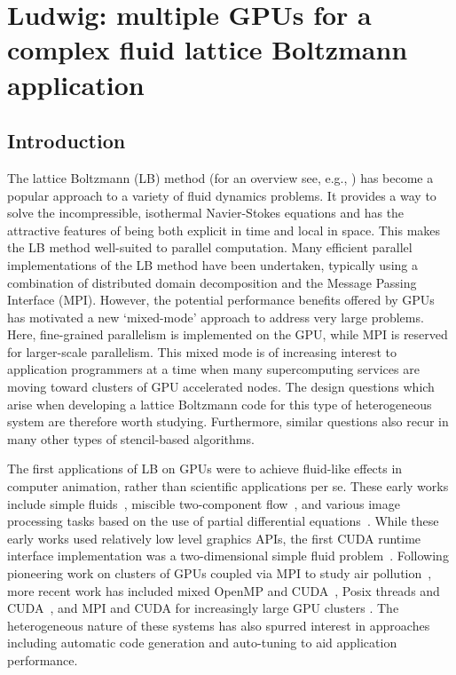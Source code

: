 
\chapter{Ludwig: multiple GPUs for a complex fluid lattice Boltzmann
application}



\section{Introduction}  
The lattice Boltzmann (LB) method (for an overview see, e.g.,
\cite{succi-book}) has become a popular approach to a variety of fluid
dynamics problems.  It provides a way to solve the incompressible,
isothermal Navier-Stokes equations and has the attractive features of
being both explicit in time and local in space. This makes the LB
method well-suited to parallel computation. Many efficient parallel
implementations of the LB method have been undertaken, typically using
a combination of distributed domain decomposition and the Message
Passing Interface (MPI). However, the potential
performance benefits offered by GPUs has motivated a new `mixed-mode'
approach to address very large problems. Here, fine-grained
parallelism is implemented on the GPU, while MPI is reserved for
larger-scale parallelism.  This mixed mode is of increasing interest
to application programmers at a time when many supercomputing services
are moving
toward clusters of GPU accelerated nodes. The design questions which
arise when developing a lattice Boltzmann code for this type of
heterogeneous system are therefore worth studying. Furthermore, similar
questions also recur in many other types of stencil-based algorithms.

The first applications of LB on GPUs were to achieve fluid-like
effects in computer animation, rather than scientific applications per
se.  These early works include simple fluids~\cite{wei2004}, miscible
two-component flow~\cite{zhu2006}, and various image processing tasks
based on the use of partial differential equations~\cite{zhao2007}.
While these early works used relatively low level graphics APIs, the
first CUDA runtime interface implementation was a two-dimensional
simple fluid problem~\cite{toelke2010}.  Following pioneering work on
clusters of GPUs coupled via MPI to study air
pollution~\cite{fan2004}, more recent work has included mixed OpenMP
and CUDA~\cite{myre2011}, Posix threads and CUDA~\cite{obrecht2011},
and MPI and CUDA for increasingly large GPU clusters
\cite{bernaschi2010,xian2011,feichtinger2011}. The heterogeneous
nature of these systems has also spurred interest in approaches
including automatic code generation \cite{walshsaar2012} and auto-tuning
\cite{williams2011} to aid application performance.

